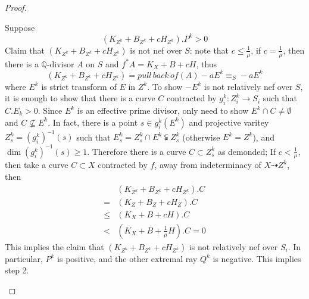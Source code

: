 \documentclass{article}
\begin{document}
\begin{proof}
\begin{enumerate}[Step 1]
    Suppose
    $$ (K_{Z^k}+B_{Z^k}+cH_{Z^k}).P^k>0 $$
    Claim that $ (K_{Z^k}+B_{Z^k}+cH_{Z^k}) $ is not nef over $ S $: note that $ c\leqslant \frac{1}{\mu} $, if $ c=\frac{1}{\mu} $, then there is a $ \mathbb{Q} $-divisor $ A $ on $ S $ and $ f^*A=K_X+B+cH $, thus 
    $$ (K_{Z^k}+B_{Z^k}+cH_{Z^k})=pull\,back\,of (A)-aE^k\equiv_S -aE^k $$
    where $ E^k $ is strict transform of $ E $ in $ Z^k $. To show $ -E^k $ is not relatively nef over $ S $, it is enough to show that there is a curve $ C $ contracted by $ g_i^k:Z^k_i\to S_i $ such that $ C.E_k>0 $.  Since $ E^k $ is an effective prime divisor, only need to show $ E^k\cap C\neq \emptyset $ and $ C\nsubseteq E^k $. In fact, there is a point $ s\in g_i^k(E^k) $ and projective varitey $ Z^k_s=(g_i^k)^{-1}(s) $ such that $ E^k_s=Z^k_s\cap E^k\subsetneqq Z^k_s $ (otherwise $ E^k=Z^k $), and $ \dim (g_i^k)^{-1}(s)\geqslant 1 $. Therefore there is a curve $ C\subset Z^k_s $ as demonded; If $ c<\frac{1}{\mu} $, then take a curve $ C\subset X $ contracted by $ f $, away from indeterminacy of $ X\dashrightarrow Z^k $, then
    \begin{equation*}
      \begin{aligned}
        &(K_{Z^k}+B_{Z^k}+cH_{Z^k}).C\\
        =&   (K_{Z}+B_{Z}+cH_{Z}).C\\
        \leqslant& (K_{X}+B+cH).C\\
        <&(K_X+B+\frac{1}{\mu}H).C=0
      \end{aligned}
    \end{equation*} 
    This implies the claim that $ (K_{Z^k}+B_{Z^k}+cH_{Z^k}) $ is not relatively nef over $ S_i $. In particular,  $ P^k $ is positive, and the other extremal ray $ Q^k $ is negative. This implies step 2. 
    

\end{enumerate}
\end{proof}
\end{document}
